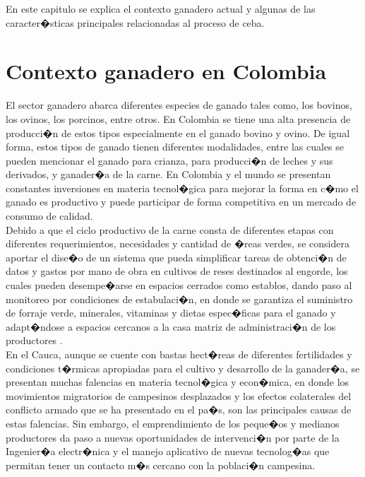 

En este capitulo se explica el contexto ganadero actual y algunas de las caracter�sticas principales relacionadas al proceso de ceba.

\section{Contexto ganadero en Colombia} \label{tgan}

El sector ganadero abarca diferentes especies de ganado tales como, los bovinos, los ovinos, los porcinos, entre otros. En Colombia se tiene una alta presencia de producci�n de estos tipos especialmente en el ganado bovino y ovino. De igual forma, estos tipos de ganado tienen diferentes modalidades, entre las cuales se pueden mencionar el ganado para crianza, para producci�n de leches y sus derivados, y ganader�a de la carne. En Colombia y el mundo se presentan constantes inversiones en materia tecnol�gica para mejorar la forma en c�mo el ganado es productivo y puede participar de forma competitiva en un mercado de consumo de calidad.\\

Debido a que el ciclo productivo de la carne consta de diferentes etapas con diferentes requerimientos, necesidades y cantidad de �reas verdes, se considera aportar el dise�o de un sistema que pueda simplificar  tareas de obtenci�n de datos y gastos por mano de obra en cultivos de reses destinados al engorde, los cuales pueden desempe�arse en espacios cerrados como establos, dando paso al monitoreo por condiciones de estabulaci�n, en donde se garantiza el suministro de forraje verde, minerales, vitaminas y dietas espec�ficas para el ganado y adapt�ndose a espacios cercanos a la casa matriz de administraci�n de los productores \cite{contextoganadero}.\\

En el Cauca, aunque se cuente con bastas hect�reas de diferentes fertilidades y condiciones t�rmicas apropiadas para el cultivo y desarrollo de la ganader�a, se presentan muchas falencias en materia tecnol�gica y econ�mica, en donde los movimientos migratorios de campesinos desplazados y los efectos colaterales del conflicto armado que se ha presentado en el pa�s, son las principales causas de estas falencias. Sin embargo, el emprendimiento de los peque�os y medianos productores da paso a nuevas oportunidades de intervenci�n por parte de la Ingenier�a electr�nica y el manejo aplicativo de nuevas tecnolog�as que permitan tener un contacto m�s cercano con la poblaci�n campesina. \\

